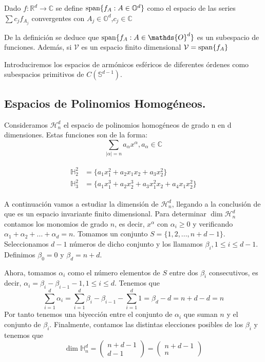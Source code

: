 \begin{defn}Dado $f:\mathds{R}^d \to \mathds{C}$ se define $\operatorname{span}\{f_A : A \in \mathbb{O}^d\}$ como el espacio de las series $\sum c_jf_{A_j}$ convergentes con $A_j \in \mathds{O}^d$,$c_j \in \mathds{C}$ 
\end{defn}
De la definición se deduce que $\spn\{f_A : A \in \mathds{O}^d\}$ es un subespacio de funciones. Además, si $\mathcal{V}$ es un espacio finito dimensional $\mathcal{V} = \operatorname{span}\{f_A\}$
\medskip

Introduciremos los espacios de armónicos esféricos de diferentes órdenes como subespacios primitivos de $C(\mathds{S}^{d-1})$. 
\subsection{Espacios de Polinomios Homogéneos.}
Consideramos $\mathcal{H}^d_n$ el espacio de polinomios homogéneos de grado n en d dimensiones. Estas funciones son de la forma:
$$
\sum_{|\alpha|=n}a_\alpha x^\alpha, a_\alpha \in \mathds{C}
$$
\begin{example}
	\begin{gather*}
	\begin{aligned}
		\mathds{H}^2_2 &= \{ a_1x_1^2 + a_2x_1x_2 + a_3x_2^2\} \\
		\mathds{H}^2_3 &= \{ a_1x_1^3 + a_2x_2^3 + a_3x_1^2x_2 + a_4x_1x_2^2 \}
	\end{aligned}
	\end{gather*}
\end{example}
\medskip
A continuación vamos a estudiar la dimensión de  $\mathcal{H}^d_n$, llegando a la conclusión de que es un espacio invariante finito dimensional.
Para determinar $\dim \mathcal{H}^d_n$ contamos los monomios de grado $n$, es decir, $x^\alpha$ con $\alpha_i \ge 0$ y verificando $\alpha_1 + \alpha_2 + ... + \alpha_d = n$. Tomamos un conjunto $S=\{1,2,...,n+d-1\}$. Seleccionamos $d-1$ números de dicho conjunto y los llamamos $\beta_i, 1\leq i \leq d-1$. Definimos  $\beta_0 = 0 $ y $\beta_d = n+d$.

Ahora, tomamos $\alpha_i$ como el número elementos de $S$ entre dos $\beta_i$ consecutivos, es decir, $ \alpha_i =  \beta_i - \beta_{i-1} - 1,  1\leq i \leq d$. Tenemos que $$
\sum_{i=1}^{d} \alpha_i = \sum_{i=1}^{d} \beta_i - \beta_{i-1} - \sum_{i=1}^{d} 1 = \beta_d - d = n+d-d = n
$$
Por tanto tenemos una biyección entre el conjunto de $\alpha_i$ que suman $n$ y el conjunto de $\beta_i$. Finalmente, contamos las distintas elecciones posibles de los $\beta_i$ y tenemos que
$$
\dim \mathds{H}^d_n = \begin{pmatrix}
n+d-1 \\
d-1
\end{pmatrix} = \begin{pmatrix}
n+d-1 \\
n
\end{pmatrix}
$$

